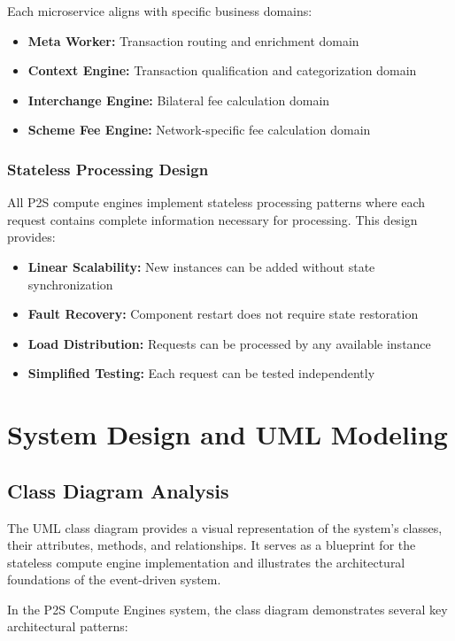 Each microservice aligns with specific business domains:
\begin{itemize}
    \item \textbf{Meta Worker:} Transaction routing and enrichment domain
    \item \textbf{Context Engine:} Transaction qualification and categorization domain
    \item \textbf{Interchange Engine:} Bilateral fee calculation domain
    \item \textbf{Scheme Fee Engine:} Network-specific fee calculation domain
\end{itemize}

\subsubsection{Stateless Processing Design}

All P2S compute engines implement stateless processing patterns where each request contains complete information necessary for processing. This design provides:

\begin{itemize}
    \item \textbf{Linear Scalability:} New instances can be added without state synchronization
    \item \textbf{Fault Recovery:} Component restart does not require state restoration
    \item \textbf{Load Distribution:} Requests can be processed by any available instance
    \item \textbf{Simplified Testing:} Each request can be tested independently
\end{itemize}

\section{System Design and UML Modeling}

\subsection{Class Diagram Analysis}

The UML class diagram provides a visual representation of the system's classes, their attributes, methods, and relationships. It serves as a blueprint for the stateless compute engine implementation and illustrates the architectural foundations of the event-driven system.

In the P2S Compute Engines system, the class diagram demonstrates several key architectural patterns:

